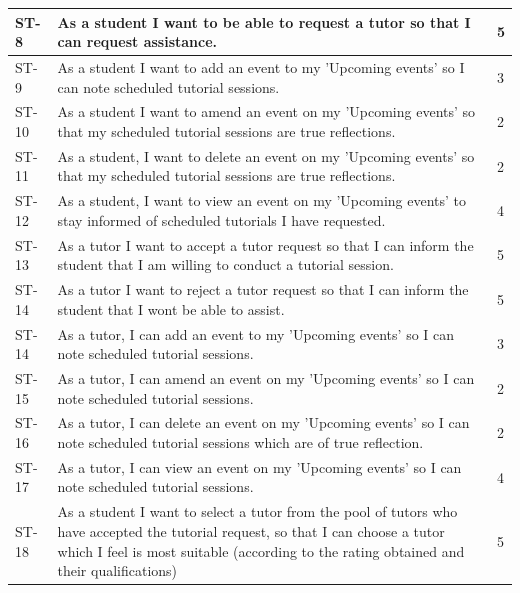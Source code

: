\documentclass[12pt]{article}
\begin{document}
{{\begin{longtable}{| l | p{10cm}| l |}
			\\ \hline ST-8 & As a student I want to be able to request a tutor so that I can request assistance.& 5
			\\ \hline ST-9 & As a student I want to add an event to my 'Upcoming events' so I can note scheduled tutorial sessions. &3

			\\ \hline ST-10 & As a student I want to amend an event on my 'Upcoming events' so that my scheduled tutorial sessions are true reflections. & 2

			\\ \hline ST-11 & As a student, I want to delete an event on my 'Upcoming events' so that my scheduled tutorial sessions are true reflections. & 2

			\\ \hline ST-12 & As a student, I want to  view an event on my 'Upcoming events' to stay informed of scheduled tutorials I have requested. & 4

			\\ \hline ST-13 & As a tutor I want to accept a tutor request so that I can inform the student that I am willing to conduct a tutorial session. &5

						\\ \hline ST-14 & As a tutor I want to  reject a tutor request so that I can inform the student that I wont be able to assist.   & 5

			\\ \hline ST-14 & As a tutor, I can  add an event to my 'Upcoming events' so I can note scheduled tutorial sessions.  & 3

			\\ \hline ST-15 & As a tutor, I can  amend an event on my 'Upcoming events' so I can note scheduled tutorial sessions.  & 2

			\\ \hline ST-16 & As a tutor, I can  delete an event on my 'Upcoming events' so I can note scheduled tutorial sessions which are of true reflection. & 2

			\\ \hline ST-17 & As a tutor, I can  view an event on my 'Upcoming events'   so I can note scheduled tutorial sessions. & 4

			\\ \hline ST-18 & As a student I want to select a tutor from the pool of tutors who have accepted the tutorial request, so that I can choose a tutor which I feel is most suitable (according to the rating obtained and their qualifications)  &5


\end{longtable}}}
\end{document}
